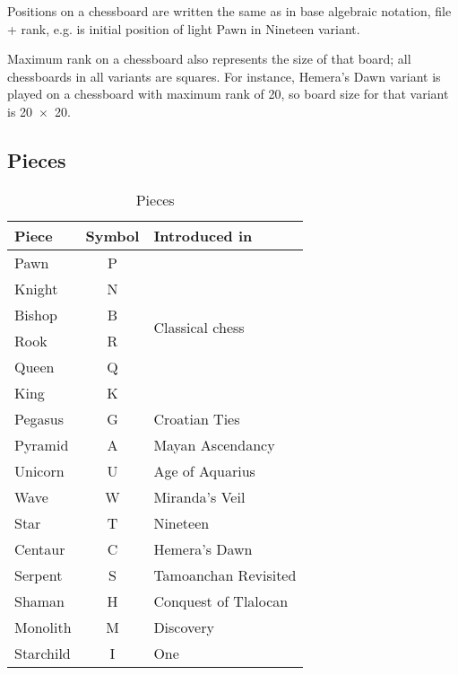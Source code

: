 Positions on a chessboard are written the same as in base algebraic notation, file + rank,
e.g.  is initial position of light Pawn in Nineteen variant.

Maximum rank on a chessboard also represents the size of that board; all chessboards in all
variants are squares. For instance, Hemera's Dawn variant is played on a chessboard with
maximum rank of 20, so board size for that variant is \mbox{20 $\times$ 20}.

\clearpage %

\subsection*{Pieces}
\label{sec:Appendix/Introduction/Pieces}

\begin{table}[!h]
\centering
\begin{tabular}{ lcl }
\toprule
\textbf{Piece} & \textbf{Symbol} & \textbf{Introduced in}           \\
\midrule
Pawn           & P               & \multirow{6}{*}{Classical chess} \\
Knight         & N               &                                  \\
Bishop         & B               &                                  \\
Rook           & R               &                                  \\
Queen          & Q               &                                  \\
King           & K               &                                  \\ \cmidrule{1-3}
Pegasus        & G               & Croatian Ties                    \\
Pyramid        & A               & Mayan Ascendancy                 \\
Unicorn        & U               & Age of Aquarius                  \\
Wave           & W               & Miranda's Veil                   \\
Star           & T               & Nineteen                         \\
Centaur        & C               & Hemera's Dawn                    \\
Serpent        & S               & Tamoanchan Revisited             \\
Shaman         & H               & Conquest of Tlalocan             \\
Monolith       & M               & Discovery                        \\
Starchild      & I               & One                              \\
\bottomrule
\end{tabular}
\caption{Pieces}
\label{tbl:Appendix/Introduction/Pieces}
\end{table}


